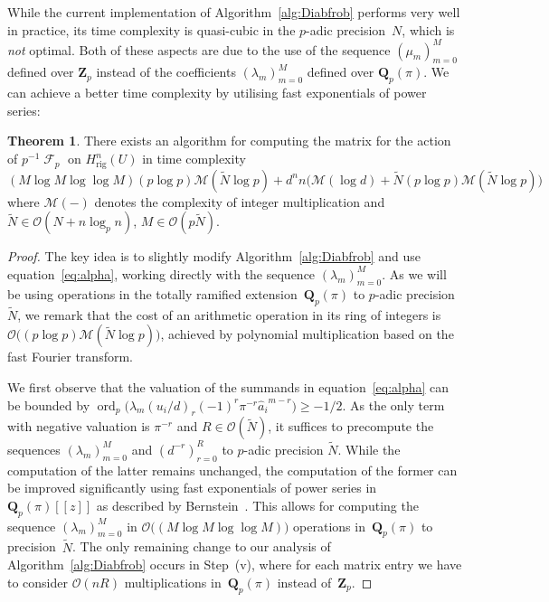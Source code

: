 \documentclass[a4paper,11pt]{article}
\numberwithin{equation}{section}
\newcommand{\ZZ}{\mathbf{Z}} %
\newcommand{\QQ}{\mathbf{Q}} %
\DeclareMathOperator{\ord}{ord}          %
\DeclareMathOperator{\Frob}{\mathcal{F}} %
\providecommand{\Hrig}{H_{\text{rig}}}  %
\providecommand{\cM}{\mathcal{M}} %
\providecommand{\BigOh}{\mathcal{O}} %
\theoremstyle{definition}
\newtheorem{thm}{Theorem}[section]
\begin{document}
While the current implementation of Algorithm~\ref{alg:Diabfrob} 
performs very well in practice, its time complexity is quasi-cubic in 
the $p$-adic precision~$N$, which is \emph{not} optimal.  Both of 
these aspects are due to the use of the sequence $(\mu_m)_{m=0}^{M}$ 
defined over $\ZZ_p$ instead of the coefficients $(\lambda_m)_{m=0}^{M}$ 
defined over $\QQ_p(\pi)$.  We can achieve a better time complexity by 
utilising fast exponentials of power series:

\begin{thm} \label{thm:DiagfrobComplexity2}
There exists an algorithm for computing the matrix for the 
action of $p^{-1} \Frob_p$ on $\Hrig^{n}(U)$ in time complexity 
\begin{equation*}
(M \log M \log \log M) (p \log p) \cM(\tilde{N} \log p) 
+ d^n n \bigl( \cM(\log d) 
              + \tilde{N} (p \log p) \cM(\tilde{N} \log p) \bigr)
\end{equation*}
where $\cM(-)$ denotes the complexity of integer multiplication 
and $\tilde{N} \in \BigOh(N + n \log_p n)$, $M \in \BigOh(p \tilde{N})$.
\end{thm}

\begin{proof}
The key idea is to slightly modify Algorithm~\ref{alg:Diabfrob} 
and use equation~\eqref{eq:alpha}, working directly with the sequence 
$(\lambda_m)_{m=0}^{M}$.  As we will be using operations in the 
totally ramified extension~$\QQ_p(\pi)$ to 
$p$-adic precision~$\tilde{N}$, we remark that the cost of 
an arithmetic operation in its ring of integers is 
$\BigOh\bigl((p \log p) \cM(\tilde{N} \log p)\bigr)$, 
achieved by polynomial multiplication based on the fast Fourier 
transform.

We first observe that the valuation of the summands in 
equation~\eqref{eq:alpha} can be bounded by 
$\ord_p \bigl(\lambda_m (u_i / d)_r (-1)^r \pi^{-r} {\hat{a}_i}^{m-r} \bigr) \geq - 1/2$.
As the only term with negative valuation is $\pi^{-r}$ and 
$R \in \BigOh(\tilde{N})$, it suffices to precompute 
the sequences $(\lambda_m)_{m=0}^{M}$ and $(d^{-r})_{r=0}^{R}$ 
to $p$-adic precision $\tilde{N}$.  While the computation 
of the latter remains unchanged, the computation of the former 
can be improved significantly using fast exponentials of 
power series in $\QQ_p(\pi)[[z]]$ as described by 
Bernstein~\citep[\S 9.3]{Bernstein2008}.  This allows for 
computing the sequence $(\lambda_m)_{m=0}^{M}$ in 
$\BigOh\bigl( (M \log M \log \log M) \bigr)$ operations 
in~$\QQ_p(\pi)$ to precision~$\tilde{N}$.  The only 
remaining change to our analysis of Algorithm~\ref{alg:Diabfrob} 
occurs in {Step~(v)}, where for each matrix entry we have to consider 
$\BigOh(n R)$ multiplications in~$\QQ_p(\pi)$ instead 
of~$\ZZ_p$.
\end{proof}
\end{document}
